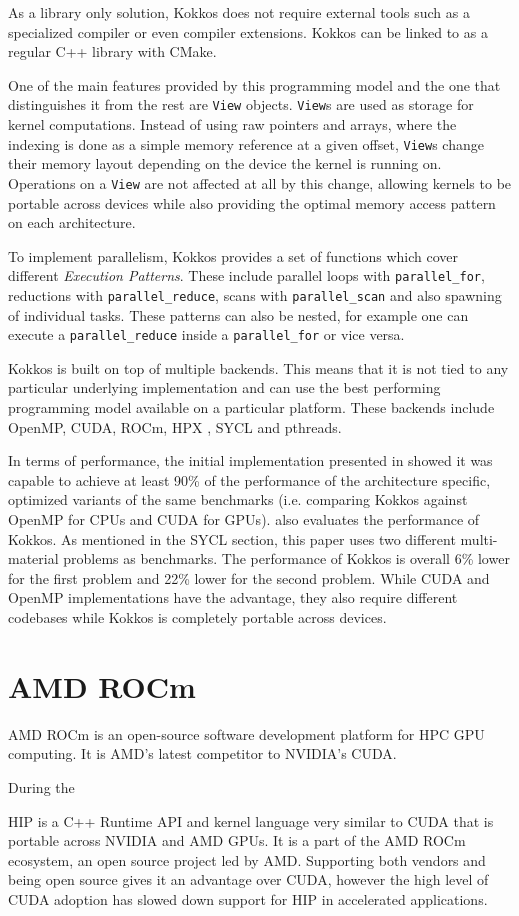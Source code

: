 As a library only solution, Kokkos does not require external tools such as a specialized compiler or even compiler extensions. Kokkos can be linked to as a regular C++ library with CMake.

One of the main features provided by this programming model and the one that distinguishes it from the rest are \texttt{View} objects. \texttt{View}s are used as storage for kernel computations. Instead of using raw pointers and arrays, where the indexing is done as a simple memory reference at a given offset, \texttt{View}s change their memory layout depending on the device the kernel is running on. Operations on a \texttt{View} are not affected at all by this change, allowing kernels to be portable across devices while also providing the optimal memory access pattern on each architecture.

To implement parallelism, Kokkos provides a set of functions which cover different \textit{Execution Patterns}. These include parallel loops with \texttt{parallel\_for}, reductions with \texttt{parallel\_reduce}, scans with \texttt{parallel\_scan} and also spawning of individual tasks. These patterns can also be nested, for example one can execute a \texttt{parallel\_reduce} inside a \texttt{parallel\_for} or vice versa.

Kokkos is built on top of multiple backends. This means that it is not tied to any particular underlying implementation and can use the best performing programming model available on a particular platform. These backends include OpenMP, CUDA, ROCm, HPX \cite{hpx}, SYCL and pthreads.

In terms of performance, the initial implementation presented in \cite{kokkos} showed it was capable to achieve at least 90\% of the performance of the architecture specific, optimized variants of the same benchmarks (i.e. comparing Kokkos against OpenMP for CPUs and CUDA for GPUs). \cite{performance_portability_multimaterial_kernels} also evaluates the performance of Kokkos. As mentioned in the SYCL section, this paper uses two different multi-material problems as benchmarks. The performance of Kokkos is overall 6\% lower for the first problem and 22\% lower for the second problem. While CUDA and OpenMP implementations have the advantage, they also require different codebases while Kokkos is completely portable across devices.

\section{AMD ROCm}
AMD ROCm is an open-source software development platform for HPC GPU computing. It is AMD's latest competitor to NVIDIA's CUDA. 

During the 

HIP is a C++ Runtime API and kernel language very similar to CUDA that is portable across NVIDIA and AMD GPUs. It is a part of the AMD ROCm ecosystem, an open source project led by AMD. Supporting both vendors and being open source gives it an advantage over CUDA, however the high level of CUDA adoption has slowed down support for HIP in accelerated applications.